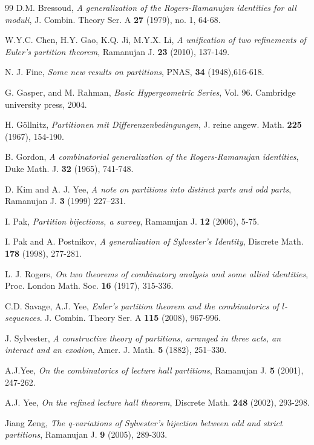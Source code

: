 \documentclass[draft]{amsart}
\numberwithin{equation}{section}
\theoremstyle{plain}
\theoremstyle{remark}
\begin{document}
\begin{thebibliography}{99}
 D.M. Bressoud, \textit{A generalization of the Rogers-Ramanujan identities for all moduli}, J. Combin. Theory Ser. A  \textbf{27} (1979), no. 1, 64-68. 


 W.Y.C. Chen, H.Y. Gao, K.Q. Ji, M.Y.X. Li, \textit{A unification of two refinements of Euler's partition theorem}, Ramanujan J. \textbf{23} (2010), 137-149.


 N. J. Fine, \textit{Some new results on partitions}, PNAS,  \textbf{34} (1948),616-618.

 G. Gasper, and M. Rahman, \textit{Basic Hypergeometric Series}, Vol. 96. Cambridge university press, 2004.

 H. G\"ollnitz, \textit{Partitionen mit Differenzenbedingungen}, J. reine angew. Math. \textbf{225} (1967), 154-190.

 B. Gordon, \textit{A combinatorial generalization of the Rogers-Ramanujan identities}, Duke Math. J. \textbf{32} (1965), 741-748.


 D. Kim and A. J. Yee, \textit{A note on partitions into
distinct parts and odd parts}, Ramanujan J. \textbf{3} (1999) 227--231.

 I. Pak, \textit{Partition bijections, a survey}, Ramanujan J. \textbf{12} (2006), 5-75.

 I. Pak and A. Postnikov, \textit{A generalization of Sylvester's Identity}, Discrete Math. \textbf{178} (1998), 277-281.


 L. J. Rogers, \textit{On two theorems of combinatory analysis and some allied identities}, Proc. London Math. Soc. \textbf{16} (1917), 315-336.

 C.D. Savage, A.J. Yee, \textit{Euler's partition theorem and the combinatorics of $l$-sequences}. J. Combin. Theory Ser. A \textbf{115} (2008), 967-996.



 J. Sylvester,  \textit{A constructive theory of partitions, arranged in three acts, an interact and an exodion}, Amer. J. Math. \textbf{5} (1882), 251--330.   


 A.J.Yee, \textit{On the combinatorics of lecture hall partitions}, Ramanujan J. \textbf{5} (2001), 247-262.

 A.J. Yee, \textit{On the refined lecture hall theorem}, Discrete Math. \textbf{248} (2002),  293-298.

 Jiang Zeng, \textit{The q-variations of Sylvester's bijection between odd and strict partitions}, Ramanujan J. \textbf{9} (2005), 289-303.
\end{thebibliography}
\end{document}
